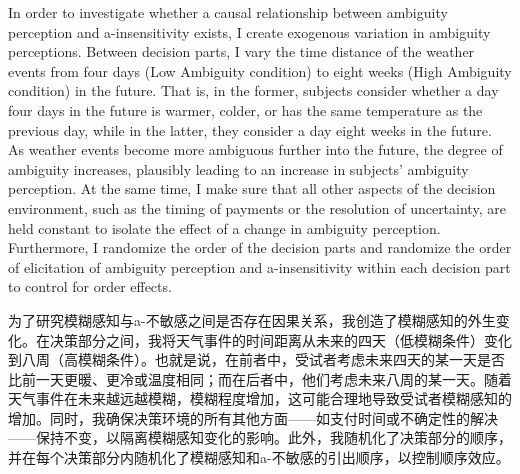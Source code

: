 \documentclass[12pt,a4paper]{article}
\newenvironment{original}
  {\par\medskip\noindent\color{black}\ignorespaces}
  {\par\medskip}
\newenvironment{translation}
  {\par\noindent\color{transblue}\ignorespaces}
  {\par\medskip\medskip}
\begin{document}
\begin{original}
In order to investigate whether a causal relationship between ambiguity perception and a-insensitivity exists, I create exogenous variation in ambiguity perceptions. Between decision parts, I vary the time distance of the weather events from four days (Low Ambiguity condition) to eight weeks (High Ambiguity condition) in the future. That is, in the former, subjects consider whether a day four days in the future is warmer, colder, or has the same temperature as the previous day, while in the latter, they consider a day eight weeks in the future. As weather events become more ambiguous further into the future, the degree of ambiguity increases, plausibly leading to an increase in subjects' ambiguity perception. At the same time, I make sure that all other aspects of the decision environment, such as the timing of payments or the resolution of uncertainty, are held constant to isolate the effect of a change in ambiguity perception. Furthermore, I randomize the order of the decision parts and randomize the order of elicitation of ambiguity perception and a-insensitivity within each decision part to control for order effects.
\end{original}

\begin{translation}
为了研究模糊感知与a-不敏感之间是否存在因果关系，我创造了模糊感知的外生变化。在决策部分之间，我将天气事件的时间距离从未来的四天（低模糊条件）变化到八周（高模糊条件）。也就是说，在前者中，受试者考虑未来四天的某一天是否比前一天更暖、更冷或温度相同；而在后者中，他们考虑未来八周的某一天。随着天气事件在未来越远越模糊，模糊程度增加，这可能合理地导致受试者模糊感知的增加。同时，我确保决策环境的所有其他方面——如支付时间或不确定性的解决——保持不变，以隔离模糊感知变化的影响。此外，我随机化了决策部分的顺序，并在每个决策部分内随机化了模糊感知和a-不敏感的引出顺序，以控制顺序效应。
\end{translation}
\end{document}
